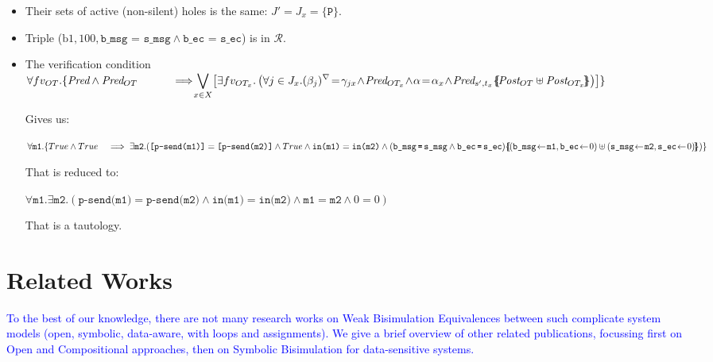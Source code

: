 \documentclass{lmcs}
\newcommand{\ERIC}[1]{\textcolor{blue}{#1}}
\newcommand{\nounderline}[1]{#1}
\begin{document}
\begin{itemize}
  \item Their sets of active (non-silent) holes is the same: $J' = J_x = \{\texttt{P}\}$.
  \item Triple ($\text{b1},  100,  \texttt{b\_msg = s\_msg} \land \texttt{b\_ec = s\_ec}$) is in $\mathcal{R}$.
  \item The verification condition \\
    $\forall fv_{OT}. \{ \Pred \land \Pred_{OT}\\
\hspace{1cm} \implies\!\!\! \displaystyle{\bigvee_{x\in X}\!
   \left[\exists fv_{OT_x}.
  \left( \forall j\in J_x. \vis{\beta_j}\!=\!\gamma_{jx}\! \land\! \Pred_{OT_x}
     \!\land\! \alpha\!=\!\alpha_x\! \land\!  
     \Pred_{s',t_x}\subst{\Post_{OT}\uplus\Post_{OT_x}}\right)\right]\}}$

\medskip Gives us:

$\forall \texttt{m1}. \{True \land True\hspace{3mm} \implies
\exists \texttt{m2}. \\
(\texttt{[p-send(m1)]} = \texttt{[p-send(m2)]}
\land True
\land \nounderline{\texttt{in(m1)}} = \nounderline{\texttt{in(m2)}} \land 
\\
(\texttt{b\_msg\!\! = \!\!s\_msg} \land \texttt{b\_ec\!\! =\!\! s\_ec}) \subst{(\texttt{b\_msg}\!\gets\! \texttt{m1}, \texttt{b\_ec}\!\gets\! 0)\uplus (\texttt{s\_msg}\!\gets\! \texttt{m2},\texttt{s\_ec}\!\gets\! 0)})\}$

\medskip That is reduced to:

$\forall \texttt{m1}. \exists \texttt{m2}.
(\texttt{p-send(m1)} = \texttt{p-send(m2)}
\land \texttt{in(m1)} = \texttt{in(m2)}
\land \texttt{m1}=\texttt{m2} \land 0=0)$

\medskip That is a tautology.

\end{itemize}

 
      
\section{Related Works}\label{sec:RW}

\ERIC{ To the best of our knowledge, there are not many research works on Weak Bisimulation Equivalences between such complicate system models (open, symbolic, data-aware, with loops and assignments).
We give a brief overview of other related publications, focussing first on Open and Compositional approaches, then on Symbolic Bisimulation for data-sensitive systems.}
\end{document}
